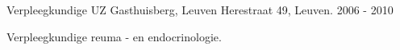 \begin{cventries}



\cventry
{Verpleegkundige} %
{UZ Gasthuisberg, Leuven} %
{Herestraat 49, Leuven.} %
{2006 - 2010} %
{ %
	\begin{cvitems}
		\item Verpleegkundige reuma - en endocrinologie.
	\end{cvitems}
}


\end{cventries}